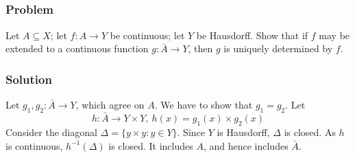 
\subsection{}

\subsubsection{Problem}
Let $A \subseteq X$; let $f : A \to Y$ be continuous; let $Y$ be Hausdorff. Show that if $f$ may be extended to a continuous function $g : \bar A \to Y$, then $g$ is uniquely determined by $f$.

\subsubsection{Solution}
Let $g_1, g_2 : \bar A \to Y$, which agree on $A$. We have to show that $g_1 = g_2$. Let
\[h : \bar A \to Y \times Y,\ h(x) = g_1(x) \times g_2(x) \]
Consider the diagonal $\Delta = \{ y \times y : y \in Y\}$. Since $Y$ is Hausdorff, $\Delta$ is closed. As $h$ is continuous, $h^{-1}(\Delta)$ is closed. It includes $A$, and hence includes $\bar A$.
